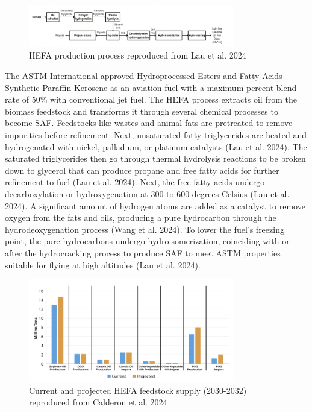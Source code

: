 \documentclass[12pt]{article}
\begin{document}
\begin{Appendix}
\begin{figure}[H]
\centering
\includegraphics[width=0.8\textwidth]{Fig 4.png} %
\caption{HEFA production process reproduced from Lau et al. 2024}
\label{figure 4}
\end{figure}
The ASTM International approved Hydroprocessed Esters and Fatty Acids-Synthetic Paraffin Kerosene as an aviation fuel with a maximum percent blend rate of 50\% with conventional jet fuel. The HEFA process extracts oil from the biomass feedstock and transforms it through several chemical processes to become SAF. Feedstocks like wastes and animal fats are pretreated to remove impurities before refinement. Next, unsaturated fatty triglycerides are heated and hydrogenated with nickel, palladium, or platinum catalysts (Lau et al. 2024). The saturated triglycerides then go through thermal hydrolysis reactions to be broken down to glycerol that can produce propane and free fatty acids for further refinement to fuel (Lau et al. 2024). Next, the free fatty acids undergo decarboxylation or hydroxygenation at 300 to 600 degrees Celsius (Lau et al. 2024). A significant amount of hydrogen atoms are added as a catalyst to remove oxygen from the fats and oils, producing a pure hydrocarbon through the hydrodeoxygenation process (Wang et al. 2024). To lower the fuel’s freezing point, the pure hydrocarbons undergo hydroisomerization, coinciding with or after the hydrocracking process to produce SAF to meet ASTM properties suitable for flying at high altitudes (Lau et al. 2024). 

\begin{figure}[H]
\centering
\includegraphics[width=0.8\textwidth]{Fig 5.png} %
\caption{Current and projected HEFA feedstock supply (2030-2032) reproduced from Calderon et al. 2024}
\label{figure 5}
\end{figure}



\end{Appendix}
\end{document}
